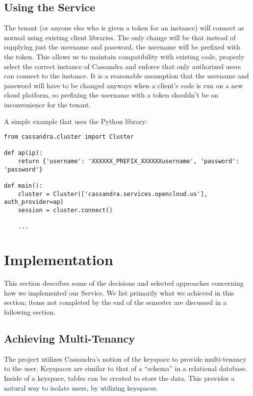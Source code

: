 \documentclass[11pt,notitlepage]{report}
\begin{document}
\section*{Using the Service}

The tenant (or anyone else who is given a token for an instance) will connect as normal using existing client libraries. The only change will be that instead of supplying just the username and password, the username will be prefixed with the token. This allows us to maintain compatibility with existing code, properly select the correct instance of Cassandra and enforce that only authorized users can connect to the instance. It is a reasonable assumption that the username and password will have to be changed anyways when a client's code is run on a new cloud platform, so prefixing the username with a token shouldn't be an inconvenience for the tenant.

A simple example that uses the Python library:

\lstset{language=Python,showspaces=false,showstringspaces=false,basicstyle=\footnotesize}
\begin{lstlisting}
from cassandra.cluster import Cluster

def ap(ip):
    return {'username': 'XXXXXX_PREFIX_XXXXXXusername', 'password': 'password'}

def main():
    cluster = Cluster(['cassandra.services.opencloud.us'], auth_provider=ap)
    session = cluster.connect()

    ...
\end{lstlisting}

\chapter*{Implementation}

This section describes some of the decisions and selected approaches concerning how we implemented our Service. We list primarily what we achieved in this section; items not completed by the end of the semester are discussed in a following section.


\section*{Achieving Multi-Tenancy}

The project utilizes Cassandra's notion of the keyspace to provide multi-tenancy to the user. Keyspaces are similar to that of a ``schema'' in a relational database. Inside of a keyspace, tables can be created to store the data. This provides a natural way to isolate users, by utilizing keyspaces.
\end{document}
